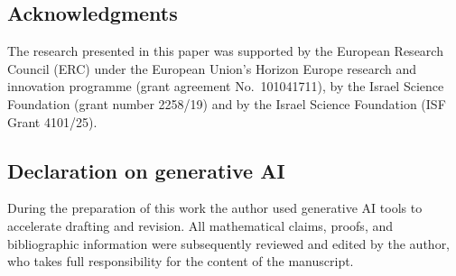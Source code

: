\documentclass[11pt]{article}
\begin{document}
\subsection*{Acknowledgments}
The research presented in this paper was supported by the European Research Council
(ERC) under the European Union's Horizon Europe research and innovation programme
(grant agreement No.\ 101041711), by the Israel Science Foundation (grant number
2258/19) and by the Israel Science Foundation (ISF Grant 4101/25).

\subsection*{Declaration on generative AI}
During the preparation of this work the author used generative AI tools to
accelerate drafting and revision.  All mathematical claims, proofs, and
bibliographic information were subsequently reviewed and edited by the author,
who takes full responsibility for the content of the manuscript.
\end{document}
